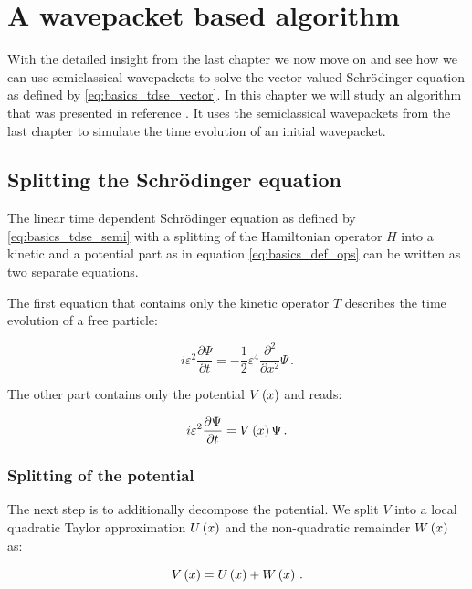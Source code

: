 \chapter{A wavepacket based algorithm}
\label{ch:wave_packet_based_algorithms}

With the detailed insight from the last chapter we now move on and see how we can
use semiclassical wavepackets to solve the vector valued Schrödinger equation
as defined by \eqref{eq:basics_tdse_vector}. In this chapter we will study an
algorithm that was presented in reference \cite{FGL_semiclassical_dynamics}. It uses the
semiclassical wavepackets from the last chapter to simulate the time evolution
of an initial wavepacket.

\section{Splitting the Schrödinger equation}

The linear time dependent Schrödinger equation as defined by \eqref{eq:basics_tdse_semi}
with a splitting of the Hamiltonian operator $H$ into a kinetic and a potential part
as in equation \eqref{eq:basics_def_ops} can be written as two separate equations.

The first equation that contains only the kinetic operator $T$ describes the time
evolution of a free particle:

\begin{equation} \label{eq:tdse_free_particle}
  i \varepsilon^2 \frac{\partial \Psi}{\partial t} = - \frac{1}{2} \varepsilon^4 \frac{\partial^2}{\partial x^2} \Psi \,.
\end{equation}

The other part contains only the potential $V\left( x \right)$ and reads:

\begin{equation} \label{eq:tdse_potential_part}
  i \varepsilon^2 \frac{\partial \Psi}{\partial t} = V\left( x \right) \Psi \,.
\end{equation}

\subsection{Splitting of the potential}

The next step is to additionally decompose the potential. We split $V$ into a
local quadratic Taylor approximation $U\left( x \right)$ and the non-quadratic remainder
$W\left( x \right)$ as:

\begin{equation}
  V\left( x \right) = U\left( x \right) + W\left( x \right) \,.
\end{equation}

